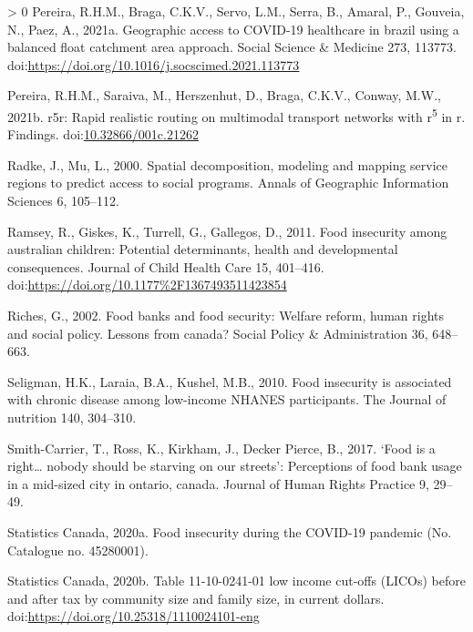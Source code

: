 \documentclass[]{elsarticle} %
\newlength{\cslhangindent}
\newenvironment{CSLReferences}[3] %
 {%
  \setlength{\parindent}{0pt}
  \ifodd #1 \everypar{\setlength{\hangindent}{\cslhangindent}}\ignorespaces\fi
  \ifnum #2 > 0
  \setlength{\parskip}{#2\baselineskip}
  \fi
 }%
 {}
\begin{document}
\begin{CSLReferences}{1}{0}
\leavevmode\hypertarget{ref-pereira2021geographic}{}%
Pereira, R.H.M., Braga, C.K.V., Servo, L.M., Serra, B., Amaral, P.,
Gouveia, N., Paez, A., 2021a. Geographic access to COVID-19 healthcare
in brazil using a balanced float catchment area approach. Social Science
\& Medicine 273, 113773.
doi:\url{https://doi.org/10.1016/j.socscimed.2021.113773}

\leavevmode\hypertarget{ref-pereira2021r5r}{}%
Pereira, R.H.M., Saraiva, M., Herszenhut, D., Braga, C.K.V., Conway,
M.W., 2021b. r5r: Rapid realistic routing on multimodal transport
networks with r\textsuperscript{5} in r. Findings.
doi:\href{https://doi.org/10.32866/001c.21262}{10.32866/001c.21262}

\leavevmode\hypertarget{ref-radke2000spatial}{}%
Radke, J., Mu, L., 2000. Spatial decomposition, modeling and mapping
service regions to predict access to social programs. Annals of
Geographic Information Sciences 6, 105--112.

\leavevmode\hypertarget{ref-ramsey2011food}{}%
Ramsey, R., Giskes, K., Turrell, G., Gallegos, D., 2011. Food insecurity
among australian children: Potential determinants, health and
developmental consequences. Journal of Child Health Care 15, 401--416.
doi:\url{https://doi.org/10.1177\%2F1367493511423854}

\leavevmode\hypertarget{ref-riches2002food}{}%
Riches, G., 2002. Food banks and food security: Welfare reform, human
rights and social policy. Lessons from canada? Social Policy \&
Administration 36, 648--663.

\leavevmode\hypertarget{ref-seligman2010food}{}%
Seligman, H.K., Laraia, B.A., Kushel, M.B., 2010. Food insecurity is
associated with chronic disease among low-income NHANES participants.
The Journal of nutrition 140, 304--310.

\leavevmode\hypertarget{ref-smith2017food}{}%
Smith-Carrier, T., Ross, K., Kirkham, J., Decker Pierce, B., 2017.
{`Food is a right\ldots{} nobody should be starving on our streets'}:
Perceptions of food bank usage in a mid-sized city in ontario, canada.
Journal of Human Rights Practice 9, 29--49.

\leavevmode\hypertarget{ref-statisticscanada2020food}{}%
Statistics Canada, 2020a. Food insecurity during the COVID-19 pandemic
(No. Catalogue no. 45280001).

\leavevmode\hypertarget{ref-statisticscanada2020licos}{}%
Statistics Canada, 2020b. Table 11-10-0241-01 low income cut-offs
(LICOs) before and after tax by community size and family size, in
current dollars. doi:\url{https://doi.org/10.25318/1110024101-eng}


\end{CSLReferences}
\end{document}
